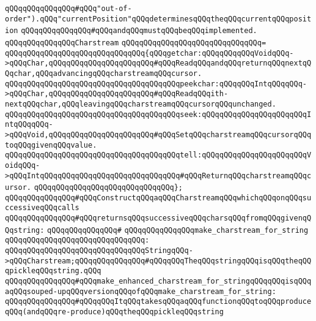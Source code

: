\verb|qQQqqQQqqQQqqQQq#qQQq"out-of-order").qQQq"currentPosition"qQQqdeterminesqQQqtheqQQqcurrentqQQqposition|\newline
\verb|qQQqqQQqqQQqqQQq#qQQqandqQQqmustqQQqbeqQQqimplemented.|\newline
\newline
\verb|qQQqqQQqqQQqqQQqCharstream|\newline
\verb|qQQqqQQqqQQqqQQqqQQqqQQqqQQqqQQq=|\newline
\verb|qQQqqQQqqQQqqQQqqQQqqQQqqQQqqQQq{qQQqgetchar:qQQqqQQqqQQqVoidqQQq->qQQqChar,qQQqqQQqqQQqqQQqqQQqqQQq#qQQqReadqQQqandqQQqreturnqQQqnextqQQqchar,qQQqadvancingqQQqcharstreamqQQqcursor.|\newline
\verb|qQQqqQQqqQQqqQQqqQQqqQQqqQQqqQQqqQQqqQQqpeekchar:qQQqqQQqIntqQQqqQQq->qQQqChar,qQQqqQQqqQQqqQQqqQQqqQQq#qQQqReadqQQqith-nextqQQqchar,qQQqleavingqQQqcharstreamqQQqcursorqQQqunchanged.|\newline
\verb|qQQqqQQqqQQqqQQqqQQqqQQqqQQqqQQqqQQqqQQqseek:qQQqqQQqqQQqqQQqqQQqqQQqIntqQQqqQQq->qQQqVoid,qQQqqQQqqQQqqQQqqQQqqQQq#qQQqSetqQQqcharstreamqQQqcursorqQQqtoqQQqgivenqQQqvalue.|\newline
\verb|qQQqqQQqqQQqqQQqqQQqqQQqqQQqqQQqqQQqqQQqtell:qQQqqQQqqQQqqQQqqQQqqQQqVoidqQQq->qQQqIntqQQqqQQqqQQqqQQqqQQqqQQqqQQqqQQq#qQQqReturnqQQqcharstreamqQQqcursor.|\newline
\verb|qQQqqQQqqQQqqQQqqQQqqQQqqQQqqQQq};|\newline
\newline
\verb|qQQqqQQqqQQqqQQq#qQQqConstructqQQqaqQQqCharstreamqQQqwhichqQQqonqQQqsuccessiveqQQqcalls|\newline
\verb|qQQqqQQqqQQqqQQq#qQQqreturnsqQQqsuccessiveqQQqcharsqQQqfromqQQqgivenqQQqstring:|\newline
\verb|qQQqqQQqqQQqqQQq#|\newline
\verb|qQQqqQQqqQQqqQQqmake_charstream_for_string|\newline
\verb|qQQqqQQqqQQqqQQqqQQqqQQqqQQqqQQq:|\newline
\verb|qQQqqQQqqQQqqQQqqQQqqQQqqQQqqQQqStringqQQq->qQQqCharstream;qQQqqQQqqQQqqQQq#qQQqqQQqTheqQQqstringqQQqisqQQqtheqQQqpickleqQQqstring.qQQq|\newline
\newline
\newline
\verb|qQQqqQQqqQQqqQQq#qQQqmake_enhanced_charstream_for_stringqQQqqQQqisqQQqaqQQqsouped-upqQQqversionqQQqofqQQqmake_charstream_for_string:|\newline
\verb|qQQqqQQqqQQqqQQq#qQQqqQQqItqQQqtakesqQQqaqQQqfunctionqQQqtoqQQqproduceqQQq(andqQQqre-produce)qQQqtheqQQqpickleqQQqstring|\newline
